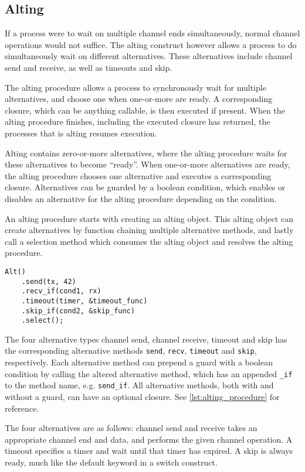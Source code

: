 \subsection{Alting}

If a process were to wait on multiple channel ends simultaneously, normal channel operations would not suffice. The alting construct however allows a process to do simultaneously wait on different alternatives. These alternatives include channel send and receive, as well as timeouts and skip.

The alting procedure allows a process to synchronously wait for multiple alternatives, and choose one when one\hyp{}or\hyp{}more are ready. A corresponding closure, which can be anything callable, is then executed if present. When the alting procedure finishes, including the executed closure has returned, the processes that is alting resumes execution.

Alting contains zero\hyp{}or\hyp{}more alternatives, where the alting procedure waits for these alternatives to become ``ready''. When one\hyp{}or\hyp{}more alternatives are ready, the alting procedure chooses one alternative and executes a corresponding closure. Alternatives can be guarded by a boolean condition, which enables or disables an alternative for the alting procedure depending on the condition.

An alting procedure starts with creating an alting object. This alting object can create alternatives by function chaining multiple alternative methods, and lastly call a selection method which consumes the alting object and resolves the alting procedure.

\begin{lstfloat}
\begin{lstlisting}[caption={Example of the alting construct.}, label={lst:alting_procedure}, style={CustomC++}]
Alt()
    .send(tx, 42)
    .recv_if(cond1, rx)
    .timeout(timer, &timeout_func)
    .skip_if(cond2, &skip_func)
    .select();
\end{lstlisting}
\end{lstfloat}

The four alternative types channel send, channel receive, timeout and skip has the corresponding alternative methods \lstinline[style={CustomC++}]|send|, \lstinline[style={CustomC++}]|recv|, \lstinline[style={CustomC++}]|timeout| and \lstinline[style={CustomC++}]|skip|, respectively. Each alternative method can prepend a guard with a boolean condition by calling the altered alternative method, which has an appended \lstinline[style={CustomC++}]|_if| to the method name, e.g. \lstinline[style={CustomC++}]|send_if|. All alternative methods, both with and without a guard, can have an optional closure. See \cref{lst:alting_procedure} for reference.

The four alternatives are as follows: channel send and receive takes an appropriate channel end and data, and performs the given channel operation. A timeout specifies a timer and wait until that timer has expired. A skip is always ready, much like the default keyword in a switch construct. 

